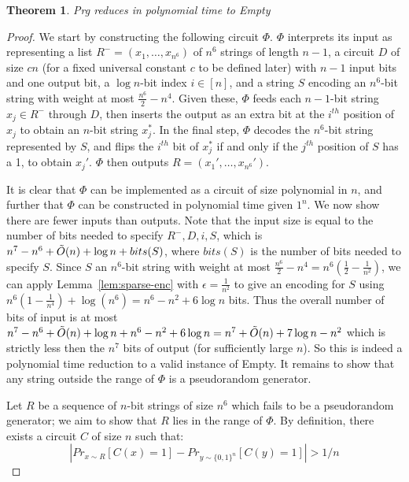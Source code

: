 \documentclass[11pt]{article}
\newtheorem{theorem}{Theorem}
\begin{document}
\begin{theorem}\label{thm:prg}
{\sc Prg} reduces in polynomial time to {\sc Empty}
\end{theorem}

\begin{proof}
We start by constructing the following circuit $\Phi$. $\Phi$ interprets its input as representing a list $R^- = (x_1, \ldots, x_{n^6})$ of $n^6$ strings of length $n-1$, a circuit $D$ of size $cn$ (for a fixed universal constant $c$ to be defined later) with $n-1$ input bits and one output bit, a $\log n$-bit index $i \in [n]$, and a string $S$ encoding an $n^6$-bit string with weight at most $\frac{n^6}{2} - n^4$. Given these, $\Phi$ feeds each $n-1$-bit string $x_j \in R^-$ through $D$, then inserts the output as an extra bit at the $i^{th}$ position of $x_j$ to obtain an $n$-bit string $x_j^*$. In the final step, $\Phi$ decodes the $n^6$-bit string represented by $S$, and flips the $i^{th}$ bit of $x_j^*$ if and only if the $j^{th}$ position of $S$ has a 1, to obtain $x_j'$. $\Phi$ then outputs $R = (x_1', \ldots, x_{n^6}')$.

It is clear that $\Phi$ can be implemented as a circuit of size polynomial in $n$, and further that $\Phi$ can be constructed in polynomial time given $1^n$. We now show there are fewer inputs than outputs. Note that the input size is equal to the number of bits needed to specify $R^-, D, i, S$, which is $n^7 - n^6 + \Tilde{O}(n) + \log n + bits(S)$, where $bits(S)$ is the number of bits needed to specify $S$. Since $S$ an $n^6$-bit string with weight at most $\frac{n^6}{2} - n^4 = n^6(\frac{1}{2} - \frac{1}{n^2})$, we can apply Lemma~\ref{lem:sparse-enc} with $\epsilon=\frac{1}{n^2}$ to give an encoding for $S$ using $n^6(1-\frac{1}{n^4}) + \log (n^6) = n^6 - n^2 + 6\log n$ bits. Thus the overall number of bits of input is at most $n^7 - n^6 + \Tilde{O}(n) + \log n + n^6 - n^2 + 6\log n = n^7 + \Tilde{O}(n) + 7\log n - n^2$ which is strictly less then the $n^7$ bits of output (for sufficiently large $n$). So this is indeed a polynomial time reduction to a valid instance of {\sc Empty}. It remains to show that any string outside the range of $\Phi$ is a pseudorandom generator.

Let $R$ be a sequence of $n$-bit strings of size $n^6$ which fails to be a pseudorandom generator; we aim to show that $R$ lies in the range of $\Phi$. By definition, there exists a circuit $C$ of size $n$ such that:
\[
|Pr_{x \sim R}[C(x)=1] - Pr_{y \sim \{0,1\}^n}[C(y)=1]| > 1/n
\]


\end{proof}
\end{document}

